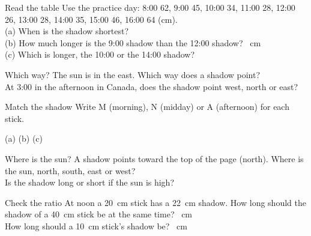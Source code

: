 \clearpage

\begin{puzzle}{Read the table}
Use the practice day: 8:00 62, 9:00 45, 10:00 34, 11:00 28, 12:00 26, 13:00 28, 14:00 35, 15:00 46, 16:00 64 (cm).\\
(a) When is the shadow shortest? \wline[1.8cm]\\
(b) How much longer is the 9:00 shadow than the 12:00 shadow? \wline[1.8cm]~cm\\
(c) Which is longer, the 10:00 or the 14:00 shadow? \wline[1.8cm]
\end{puzzle}

\begin{puzzle}{Which way?}
The sun is in the east. Which way does a shadow point? \wline[2cm]\\
At 3:00 in the afternoon in Canada, does the shadow point west, north or east? \wline[2cm]
\end{puzzle}

\begin{puzzle}{Match the shadow}
Write M (morning), N (midday) or A (afternoon) for each stick.
\begin{center}
\end{center}
(a) \wline[1cm] \quad (b) \wline[1cm] \quad (c) \wline[1cm]
\end{puzzle}

\begin{puzzle}{Where is the sun?}
A shadow points toward the top of the page (north). Where is the sun, north, south, east or west? \wline[2cm]\\
Is the shadow long or short if the sun is high? \wline[2cm]
\end{puzzle}

\begin{puzzle}{Check the ratio}
At noon a 20~cm stick has a 22~cm shadow. How long should the shadow of a 40~cm stick be at the same time? \wline[2cm]~cm\\
How long should a 10~cm stick's shadow be? \wline[2cm]~cm
\end{puzzle}
\clearpage

